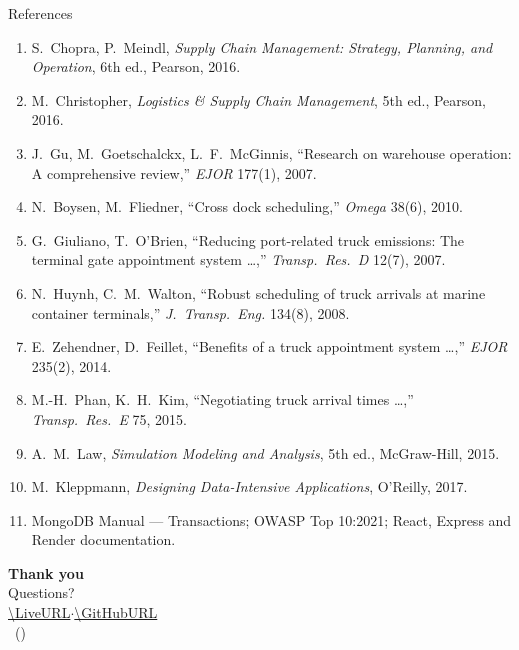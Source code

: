 \documentclass[aspectratio=169,11pt]{beamer}
\begin{document}
\begin{frame}{References}
\scriptsize
\begin{enumerate}
  \item S.~Chopra, P.~Meindl, \emph{Supply Chain Management: Strategy, Planning, and Operation}, 6th ed., Pearson, 2016.
  \item M.~Christopher, \emph{Logistics \& Supply Chain Management}, 5th ed., Pearson, 2016.
  \item J.~Gu, M.~Goetschalckx, L.~F.~McGinnis, ``Research on warehouse operation: A comprehensive review,'' \emph{EJOR} 177(1), 2007.
  \item N.~Boysen, M.~Fliedner, ``Cross dock scheduling,'' \emph{Omega} 38(6), 2010.
  \item G.~Giuliano, T.~O'Brien, ``Reducing port-related truck emissions: The terminal gate appointment system \ldots,'' \emph{Transp.\ Res.\ D} 12(7), 2007.
  \item N.~Huynh, C.~M.~Walton, ``Robust scheduling of truck arrivals at marine container terminals,'' \emph{J.\ Transp.\ Eng.} 134(8), 2008.
  \item E.~Zehendner, D.~Feillet, ``Benefits of a truck appointment system \ldots,'' \emph{EJOR} 235(2), 2014.
  \item M.-H.~Phan, K.~H.~Kim, ``Negotiating truck arrival times \ldots,'' \emph{Transp.\ Res.\ E} 75, 2015.
  \item A.~M.~Law, \emph{Simulation Modeling and Analysis}, 5th ed., McGraw-Hill, 2015.
  \item M.~Kleppmann, \emph{Designing Data-Intensive Applications}, O'Reilly, 2017.
  \item MongoDB Manual --- Transactions; OWASP Top 10:2021; React, Express and Render documentation.
\end{enumerate}
\end{frame}

\begin{frame}[plain]
\begin{center}
\vspace{1.2cm}
{\Huge\bfseries\color{brand}Thank you}\\[0.4cm]
{\large Questions?}\\[0.8cm]
\small\url{\LiveURL}\quad$\cdot$\quad\url{\GitHubURL}\\[0.3cm]
\StudentName\ (\RegisterNumber)
\end{center}
\end{frame}
\end{document}
